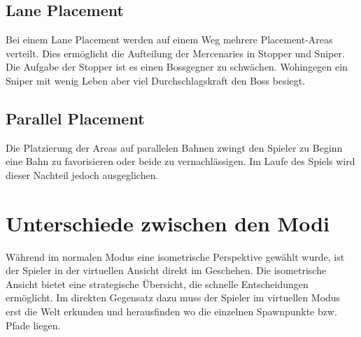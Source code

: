 \subsection{Lane Placement}
Bei einem Lane Placement werden auf einem Weg mehrere Placement-Areas verteilt.
Dies ermöglicht die Aufteilung der Mercenaries in Stopper und Sniper. 
Die Aufgabe der Stopper ist es einen Bossgegner zu schwächen. 
Wohingegen ein Sniper mit wenig Leben aber viel Durchschlagskraft den Boss besiegt.

\subsection{Parallel Placement}
Die Platzierung der Areas auf parallelen Bahnen zwingt den Spieler zu Beginn eine Bahn zu favorisieren oder beide zu vernachlässigen. 
Im Laufe des Spiels wird dieser Nachteil jedoch ausgeglichen.

\section{Unterschiede zwischen den Modi}
Während im normalen Modus eine isometrische Perspektive gewählt wurde, ist der Spieler in der virtuellen Ansicht direkt im Geschehen.
Die isometrische Ansicht bietet eine strategische Übersicht, die schnelle Entscheidungen ermöglicht.
Im direkten Gegensatz dazu muss der Spieler im virtuellen Modus erst die Welt erkunden und herausfinden wo die einzelnen Spawnpunkte bzw. Pfade liegen. 

